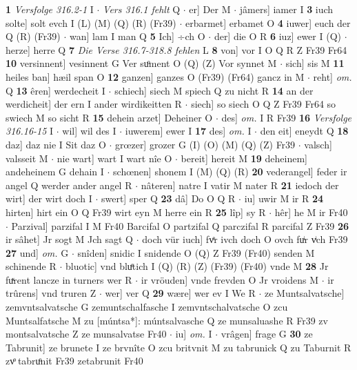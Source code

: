 \documentclass[8pt,a4paper,notitlepage]{article}
\begin{document}
\begin{table}[ht]
\begin{minipage}[t]{0.5\linewidth}
\textbf{1} \textit{Versfolge 316.2-1} I   $\cdot$ \textit{Vers 316.1 fehlt} Q   $\cdot$ er] Der M  $\cdot$ jâmers] iamer I \textbf{3} iuch solte] solt evch I (L) (M) (Q) (R) (Fr39)  $\cdot$ erbarmet] erbamet O \textbf{4} iuwer] euch der Q (R) (Fr39)  $\cdot$ wan] lam I man Q \textbf{5} Ich] ÷ch O  $\cdot$ der] die O R \textbf{6} iuz] ewer I (Q)  $\cdot$ herze] herre Q \textbf{7} \textit{Die Verse 316.7-318.8 fehlen} L  \textbf{8} von] vor I O Q R Z Fr39 Fr64 \textbf{10} versinnent] vesinnent G Ver suͦment O (Q) (Z) Vor synnet M  $\cdot$ sich] sis M \textbf{11} heiles ban] hæil span O \textbf{12} ganzen] ganzes O (Fr39) (Fr64) gancz in M  $\cdot$ reht] \textit{om.} Q \textbf{13} êren] werdecheit I  $\cdot$ schiech] siech M spiech Q zu nicht R \textbf{14} an der werdicheit] der ern I ander wirdikeitten R  $\cdot$ siech] so siech O Q Z Fr39 Fr64 so swiech M so sicht R \textbf{15} dehein arzet] Deheiner O  $\cdot$ des] \textit{om.} I R Fr39 \textbf{16} \textit{Versfolge 316.16-15} I   $\cdot$ wil] wil des I  $\cdot$ iuwerem] ewer I \textbf{17} des] \textit{om.} I  $\cdot$ den eit] eneydt Q \textbf{18} daz] daz nie I Sit daz O  $\cdot$ grœzer] grozer G (I) (O) (M) (Q) (Z) Fr39  $\cdot$ valsch] valsseit M  $\cdot$ nie wart] wart I wart nîe O  $\cdot$ bereit] hereit M \textbf{19} deheinem] andeheinem G dehain I  $\cdot$ schœnen] shonem I (M) (Q) (R) \textbf{20} vederangel] feder ir angel Q werder ander angel R  $\cdot$ nâteren] natre I vatir M nater R \textbf{21} iedoch der wirt] der wirt doch I  $\cdot$ swert] sper Q \textbf{23} dâ] Do O Q R  $\cdot$ iu] uwir M ir R \textbf{24} hirten] hirt ein O Q Fr39 wirt eyn M herre ein R \textbf{25} lîp] sy R  $\cdot$ hêr] he M ir Fr40  $\cdot$ Parzival] parzifal I M Fr40 Barcifal O partzifal Q parczifal R parcifal Z Fr39 \textbf{26} ir sâhet] Jr sogt M Jch sagt Q  $\cdot$ doch vür iuch] fvͤr ivch doch O ovch fuͥr vͥch Fr39 \textbf{27} und] \textit{om.} G  $\cdot$ snîden] snidic I snidende O (Q) Z Fr39 (Fr40) senden M schinende R  $\cdot$ bluotic] vnd bluͤtich I (Q) (R) (Z) (Fr39) (Fr40) vnde M \textbf{28} Jr fuͯrent lancze in turners wer R  $\cdot$ ir vröuden] vnde frevden O Jr vroidens M  $\cdot$ ir trûrens] vnd truren Z  $\cdot$ wer] ver Q \textbf{29} wære] wer ev I We R  $\cdot$ ze Muntsalvatsche] zemvntsalvatsche G zemuntschalfasche I zemvntschalvatsche O zcu Muntsalfatsche M zu [múntsa*]: múntsalvasche Q ze munsaluashe R Fr39 zv montsalvatsche Z ze munsalvatse Fr40  $\cdot$ iu] \textit{om.} I  $\cdot$ vrâgen] frage G \textbf{30} ze Tabrunit] ze brunete I ze brvnîte O zcu britvnit M zu tabrunick Q zu Taburnit R zvͦ tabruͦnit Fr39 zetabrunit Fr40 \newline

\end{minipage}
\end{table}
\end{document}
